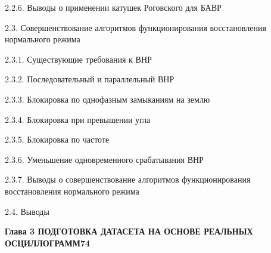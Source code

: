 \noindent\hspace*{3.0em}2.2.6. Выводы о применении катушек Роговского для БАВР\par\vspace{0.5mm}
\noindent\hspace*{1.5em}2.3. Совершенствование алгоритмов функционирования восстановления нормального режима\par\vspace{0.5mm}
\noindent\hspace*{3.0em}2.3.1. Существующие требования к ВНР\par\vspace{0.5mm}
\noindent\hspace*{3.0em}2.3.2. Последовательный и параллельный ВНР\par\vspace{0.5mm}
\noindent\hspace*{3.0em}2.3.3. Блокировка по однофазным замыканиям на землю\par\vspace{0.5mm}
\noindent\hspace*{3.0em}2.3.4. Блокировка при превышении угла\par\vspace{0.5mm}
\noindent\hspace*{3.0em}2.3.5. Блокировка по частоте\par\vspace{0.5mm}
\noindent\hspace*{3.0em}2.3.6. Уменьшение одновременного срабатывания ВНР\par\vspace{0.5mm}
\noindent\hspace*{3.0em}2.3.7. Выводы о совершенствование алгоритмов функционирования восстановления нормального режима\par\vspace{0.5mm}
\noindent\hspace*{1.5em}2.4. Выводы\par\vspace{0.5mm}
\noindent\textbf{Глава 3 ПОДГОТОВКА ДАТАСЕТА НА ОСНОВЕ РЕАЛЬНЫХ ОСЦИЛЛОГРАММ}\dotfill\textbf{74}\par\vspace{1.5mm}
